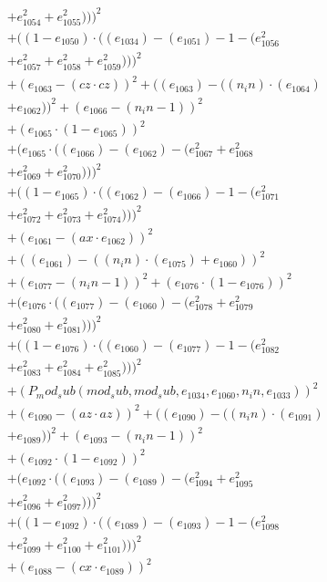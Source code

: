 \documentclass[10pt, a4paper]{article}
\begin{document}
\begin{small}
\begin{align*}
& + e_{1054}^{2} + e_{1055}^{2})))^{2} \\
& + ((1 - e_{1050})  \cdot  ((e_{1034}) - (e_{1051}) - 1 - (e_{1056}^{2} \\
& + e_{1057}^{2} + e_{1058}^{2} + e_{1059}^{2})))^{2} \\
& + (e_{1063} - (cz  \cdot  cz))^{2} + ((e_{1063}) - ((n_in)  \cdot  (e_{1064}) \\
& + e_{1062}))^{2} + (e_{1066} - (n_in - 1))^{2} \\
& + (e_{1065}  \cdot  (1 - e_{1065}))^{2} \\
& + (e_{1065}  \cdot  ((e_{1066}) - (e_{1062}) - (e_{1067}^{2} + e_{1068}^{2} \\
& + e_{1069}^{2} + e_{1070}^{2})))^{2} \\
& + ((1 - e_{1065})  \cdot  ((e_{1062}) - (e_{1066}) - 1 - (e_{1071}^{2} \\
& + e_{1072}^{2} + e_{1073}^{2} + e_{1074}^{2})))^{2} \\
& + (e_{1061} - (ax  \cdot  e_{1062}))^{2} \\
& + ((e_{1061}) - ((n_in)  \cdot  (e_{1075}) + e_{1060}))^{2} \\
& + (e_{1077} - (n_in - 1))^{2} + (e_{1076}  \cdot  (1 - e_{1076}))^{2} \\
& + (e_{1076}  \cdot  ((e_{1077}) - (e_{1060}) - (e_{1078}^{2} + e_{1079}^{2} \\
& + e_{1080}^{2} + e_{1081}^{2})))^{2} \\
& + ((1 - e_{1076})  \cdot  ((e_{1060}) - (e_{1077}) - 1 - (e_{1082}^{2} \\
& + e_{1083}^{2} + e_{1084}^{2} + e_{1085}^{2})))^{2} \\
& + (P_mod_sub(mod_sub, mod_sub, e_{1034}, e_{1060}, n_in, e_{1033}))^{2} \\
& + (e_{1090} - (az  \cdot  az))^{2} + ((e_{1090}) - ((n_in)  \cdot  (e_{1091}) \\
& + e_{1089}))^{2} + (e_{1093} - (n_in - 1))^{2} \\
& + (e_{1092}  \cdot  (1 - e_{1092}))^{2} \\
& + (e_{1092}  \cdot  ((e_{1093}) - (e_{1089}) - (e_{1094}^{2} + e_{1095}^{2} \\
& + e_{1096}^{2} + e_{1097}^{2})))^{2} \\
& + ((1 - e_{1092})  \cdot  ((e_{1089}) - (e_{1093}) - 1 - (e_{1098}^{2} \\
& + e_{1099}^{2} + e_{1100}^{2} + e_{1101}^{2})))^{2} \\
& + (e_{1088} - (cx  \cdot  e_{1089}))^{2} \\

\end{align*}
\end{small}
\end{document}
